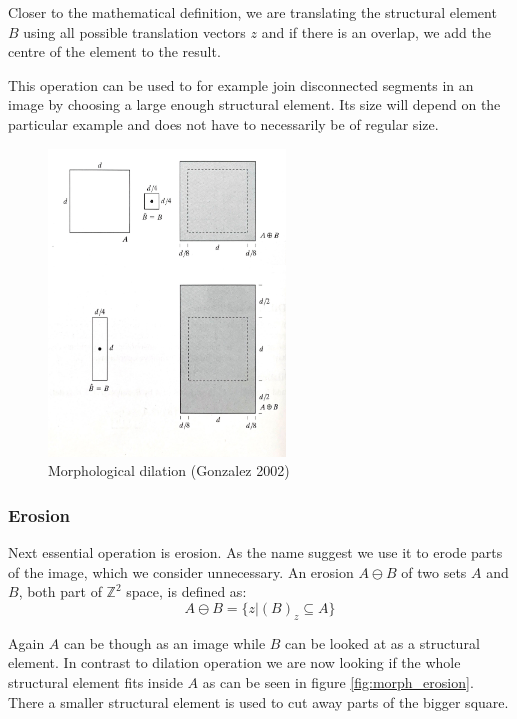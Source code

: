 \documentclass[
  digital,     %
  oneside,     %
  nosansbold,  %
  nocolorbold, %
  lof,         %
  lot,         %
]{fithesis4}
\newcommand*{\Z}{\ensuremath{\mathbb{Z}}}
\begin{document}
Closer to the mathematical definition, we
are translating the structural element $B$ using all possible translation
vectors $z$ and if there is an overlap, we add the centre of the element to the
result.

This operation can be used to for example join disconnected segments in an
image by choosing a large enough structural element. Its size will depend on the
particular example and does not have to necessarily be of regular size.

\begin{figure}
    \begin{center}
        \includegraphics[width=6.3cm]{resources/morph_dilation.jpg}
    \end{center}
    \caption{Morphological dilation (Gonzalez 2002)} %
    \label{fig:morph_dilation}
\end{figure}

\subsubsection{Erosion}

Next essential operation is erosion. As the name suggest we use it to erode
parts of the image, which we consider unnecessary. An erosion $A \ominus B$ of
two sets $A$ and $B$, both part of $\Z^2$ space, is defined as: 
$$A \ominus B = \{z | (B)_z \subseteq A\}$$

Again $A$ can be though as an image while $B$ can be looked at as a structural
element. In contrast to dilation operation we are now looking if the whole
structural element fits inside $A$ as can be seen in figure
\ref{fig:morph_erosion}. There a smaller structural element is used to cut away
parts of the bigger square.
\end{document}
